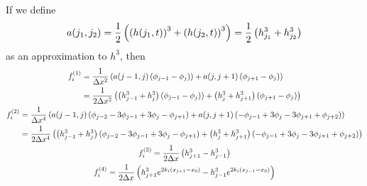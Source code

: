 If we define 
\begin{equation*}
    a\!\left( j_1, j_2 \right) = \frac{1}{2} \left( \left( h\!\left( j_1, t \right) \right)^3 + \left( h\!\left( j_2, t \right) \right)^3 \right) = \frac{1}{2} \left( h_{j_1}^3 + h_{j_2}^3 \right)
\end{equation*}
as an approximation to $h^3$, then 
\begin{gather*}
\begin{aligned}
    f_i^{(1)} &= \frac{1}{\Delta x^2} \left( a\!\left( j-1, j \right)\left( \phi_{j-1} - \phi_{j}) \right) + a\!\left( j, j+1 \right)\left( \phi_{j+1} - \phi_{j} \right) \right)\\
    &= \frac{1}{2\Delta x^2} \left( \left( h_{j-1}^3 + h_{j}^3 \right)\left( \phi_{j-1} - \phi_{j}) \right) + \left( h_{j}^3 + h_{j+1}^3 \right)\left( \phi_{j+1} - \phi_{j} \right) \right)
\end{aligned}\\
\begin{aligned}
    f_i^{(2)} &= \frac{1}{\Delta x^4} \left( a\!\left( j-1, j \right)\left( \phi_{j-2} - 3\phi_{j-1} + 3\phi_{j} - \phi_{j+1} \right) + a\!\left( j, j+1 \right)\left( -\phi_{j-1} + 3\phi_{j} - 3\phi_{j+1} + \phi_{j+2} \right) \right)\\
    &= \frac{1}{2\Delta x^4} \left( \left( h_{j-1}^3 + h_{j}^3 \right) \left( \phi_{j-2} - 3\phi_{j-1} + 3\phi_{j} - \phi_{j+1} \right) + \left( h_{j}^3 + h_{j+1}^3 \right) \left( -\phi_{j-1} + 3\phi_{j} - 3\phi_{j+1} + \phi_{j+2} \right) \right)
\end{aligned}\\
\begin{aligned}
    f_i^{(3)} = \frac{1}{2\Delta x} \left( h_{j+1}^3 - h_{j-1}^3 \right)
\end{aligned}\\
\begin{aligned}
    f_i^{(4)} = \frac{1}{2\Delta x} \left( h_{j+1}^3 e^{2k_i \left( x_{j+1} - x_0 \right)} - h_{j-1}^3 e^{2k_i \left( x_{j-1} - x_0 \right)} \right)
\end{aligned}
\end{gather*}
